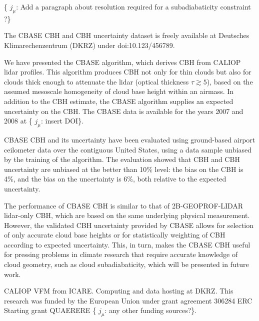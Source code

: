 \documentclass[essd,manuscript]{copernicus}\usepackage[]{graphicx}\usepackage[]{color}
\newcommand{\hlnum}[1]{\textcolor[rgb]{0.686,0.059,0.569}{#1}}%
\newcommand\comment[2]{\{\hlnum{ \textit{#1}: #2}\}}
\newcommand\commentjm[1]{\comment{$j_\mu$}{#1}}
\begin{document}
\commentjm{Add a paragraph about resolution required for a subadiabaticity
  constraint \cite{Merk2016}?}

The CBASE CBH and CBH uncertainty dataset \citep{cbase} is freely available at
Deutsches Klimarechenzentrum (DKRZ) under doi:10.123/456789.

\conclusions
\label{sec:conclusions}

We have presented the CBASE algorithm, which derives CBH from CALIOP lidar
profiles.  This algorithm produces CBH not only for thin clouds but also for
clouds thick enough to attenuate the lidar (optical thickness $\tau \gtrsim 5$),
based on the assumed mesoscale homogeneity of cloud base height within an
airmass.  In addition to the CBH estimate, the CBASE algorithm supplies an
expected uncertainty on the CBH.  The CBASE data is available for the years 2007
and 2008 at \commentjm{insert DOI}.

CBASE CBH and its uncertainty have been evaluated using
ground-based airport ceilometer data over the contiguous United States, using a
data sample unbiased by the training of the algorithm.  The evaluation showed that
CBH and CBH uncertainty are unbiased at the better
than 10\% level: the bias on the CBH is %
4\%,
and the bias on the uncertainty is %
6\%, both relative to the expected uncertainty.

The performance of CBASE CBH is similar to that of
2B-GEOPROF-LIDAR lidar-only CBH, which are based on the same
underlying physical measurement.  However, the validated CBH
uncertainty provided by CBASE allows for selection of only accurate cloud base
heights or for statistically weighting of CBH according to 
expected uncertainty.  This, in turn, makes the CBASE CBH useful
for pressing problems in climate research that require accurate knowledge of
cloud geometry, such as cloud subadiabaticity, which will be presented in future
work. 

\begin{acknowledgements}
  CALIOP VFM from ICARE.  Computing and data hosting at DKRZ.  This
  research was funded by the European Union under grant agreement 306284 ERC
  Starting grant QUAERERE \commentjm{any other funding sources?}.
\end{acknowledgements}



\end{document}

